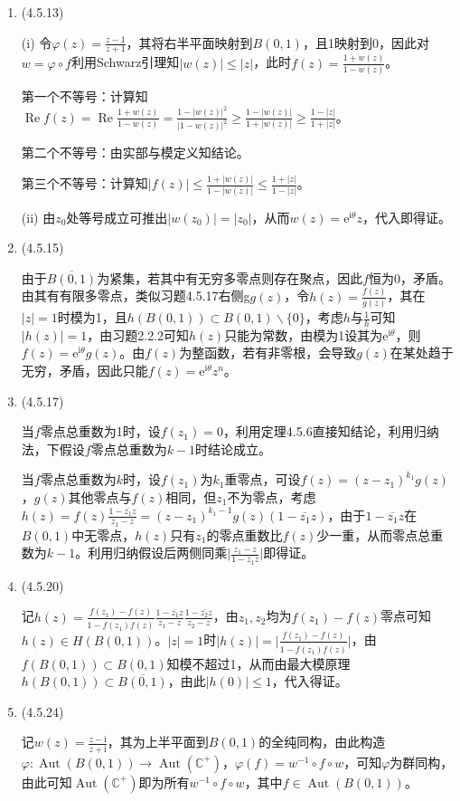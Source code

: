 \documentclass[a4paper,UTF8,fontset=windows]{ctexart}
\DeclareMathOperator{\Aut}{Aut}
\DeclareMathOperator{\re}{Re}
\begin{document}
\begin{enumerate}
    \item (4.5.13)
    
    (i)
    令$\varphi(z)=\frac{z-1}{z+1}$，其将右半平面映射到$B(0,1)$，且1映射到0，因此对$w=\varphi\circ f$利用Schwarz引理知$|w(z)|\le|z|$，此时$f(z)=\frac{1+w(z)}{1-w(z)}$。
    
    第一个不等号：计算知$\re f(z)=\re\frac{1+w(z)}{1-w(z)}=\frac{1-|w(z)|^2}{|1-w(z)|^2}\ge\frac{1-|w(z)|}{1+|w(z)|}\ge\frac{1-|z|}{1+|z|}$。
    
    第二个不等号：由实部与模定义知结论。
    
    第三个不等号：计算知$|f(z)|\le\frac{1+|w(z)|}{1-|w(z)|}\le\frac{1+|z|}{1-|z|}$。
    
    (ii)
    由$z_0$处等号成立可推出$|w(z_0)|=|z_0|$，从而$w(z)=\mathrm{e}^{\mathrm{i}\theta}z$，代入即得证。
    
    \item (4.5.15)
    
    由于$\overline{B(0,1)}$为紧集，若其中有无穷多零点则存在聚点，因此$f$恒为0，矛盾。由其有有限多零点，类似习题4.5.17右侧g$g(z)$，令$h(z)=\frac{f(z)}{g(z)}$，其在$|z|=1$时模为1，且$h(B(0,1))\subset B(0,1)\backslash\{0\}$，考虑$h$与$\frac{1}{h}$可知$|h(z)|=1$，由习题2.2.2可知$h(z)$只能为常数，由模为1设其为$\mathrm{e}^{\mathrm{i}\theta}$，则$f(z)=\mathrm{e}^{\mathrm{i}\theta}g(z)$。由$f(z)$为整函数，若有非零根，会导致$g(z)$在某处趋于无穷，矛盾，因此只能$f(z)=\mathrm{e}^{\mathrm{i}\theta}z^n$。
    
    \item (4.5.17)
    
    当$f$零点总重数为1时，设$f(z_1)=0$，利用定理4.5.6直接知结论，利用归纳法，下假设$f$零点总重数为$k-1$时结论成立。
    
    当$f$零点总重数为$k$时，设$f(z_1)$为$k_1$重零点，可设$f(z)=(z-z_1)^{k_1}g(z)$，$g(z)$其他零点与$f(z)$相同，但$z_1$不为零点，考虑$h(z)=f(z)\frac{1-\overline{z_1}z}{z_1-z}=(z-z_1)^{k_1-1}g(z)(1-\overline{z_1}z)$，由于$1-\overline{z_1}z$在$B(0,1)$中无零点，$h(z)$只有$z_1$的零点重数比$f(z)$少一重，从而零点总重数为$k-1$。利用归纳假设后两侧同乘$\big|\frac{z_1-z}{1-\overline{z_1}z}\big|$即得证。
    
    \item (4.5.20)
    
    记$h(z)=\frac{f(z_1)-f(z)}{1-\overline{f(z_1)}f(z)}\frac{1-\overline{z_1}z}{z_1-z}\frac{1-\overline{z_2}z}{z_2-z}$，由$z_1,z_2$均为$f(z_1)-f(z)$零点可知$h(z)\in H(B(0,1))$。$|z|=1$时$|h(z)|=\big|\frac{f(z_1)-f(z)}{1-\overline{f(z_1)}f(z)}\big|$，由$f(B(0,1))\subset B(0,1)$知模不超过1，从而由最大模原理$h(B(0,1))\subset\overline{B(0,1)}$，由此$|h(0)|\le1$，代入得证。
    
    \item (4.5.24)
    
    记$w(z)=\frac{z-\mathrm{i}}{z+\mathrm{i}}$，其为上半平面到$B(0,1)$的全纯同构，由此构造$\varphi:\Aut(B(0,1))\to\Aut(\mathbb{C}^+)$，$\varphi(f)=w^{-1}\circ f\circ w$，可知$\varphi$为群同构，由此可知$\Aut(\mathbb{C}^+)$即为所有$w^{-1}\circ f\circ w$，其中$f\in\Aut(B(0,1))$。
\end{enumerate}
\end{document}
